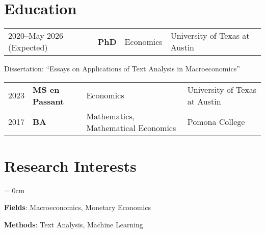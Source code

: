 \documentclass[a4paper, 10pt]{article}
\begin{document}
  \maketitle
  \thispagestyle{firststyle}
  \section{Education}
  \begin{tabular}{p{4cm} p{2.5cm} p{3.6cm} p{4.1cm}}
    2020--May 2026 (Expected) & \textbf{PhD} & Economics & University of Texas at Austin
  \end{tabular}
  \begin{compactitem}
    \item Dissertation: ``Essays on Applications of Text Analysis in Macroeconomics''
  \end{compactitem}
  \vspace{1em}
  \begin{tabular}{p{4cm} p{2.5cm} p{3.6cm} p{4.1cm}}
    2023 & \textbf{MS en Passant} & Economics & University of Texas at Austin\\
    2017 & \textbf{BA} & Mathematics, \newline Mathematical Economics & Pomona College
  \end{tabular}

  \section{Research Interests}
  \begin{compactitem}\parskip = 0cm
    \item \textbf{Fields}: Macroeconomics, Monetary Economics
    \item \textbf{Methods}: Text Analysis, Machine Learning
  \end{compactitem}
\end{document}
